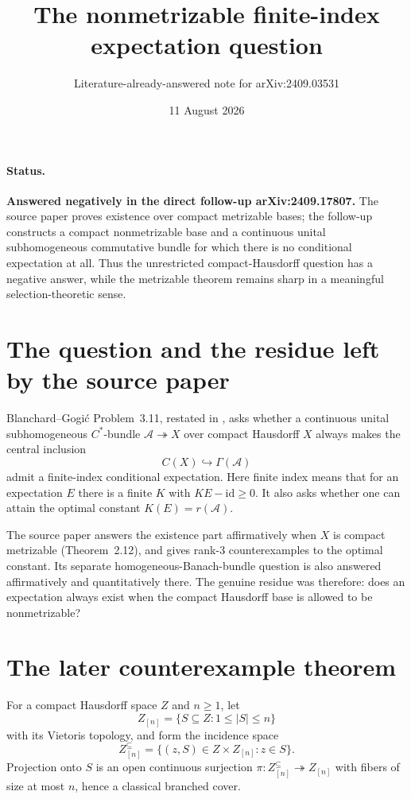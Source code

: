 \documentclass[11pt]{article}
\title{The nonmetrizable finite-index expectation question}
\author{Literature-already-answered note for arXiv:2409.03531}
\date{11 August 2026}
\newcommand{\A}{\mathcal A}
\begin{document}
\maketitle

\paragraph{Status.}
\textbf{Answered negatively in the direct follow-up arXiv:2409.17807.}
The source paper proves existence over compact metrizable bases; the follow-up
constructs a compact nonmetrizable base and a continuous unital
subhomogeneous commutative bundle for which there is no conditional
expectation at all.  Thus the unrestricted compact-Hausdorff question has a
negative answer, while the metrizable theorem remains sharp in a meaningful
selection-theoretic sense.

\section*{The question and the residue left by the source paper}
Blanchard--Gogi\'{c} Problem~3.11, restated in \cite{source}, asks whether a
continuous unital subhomogeneous $C^*$-bundle
\(
  \A\twoheadrightarrow X
\)
over compact Hausdorff $X$ always makes the central inclusion
\[
 C(X)\hookrightarrow \Gamma(\A)
\]
admit a finite-index conditional expectation.  Here finite index means that
for an expectation $E$ there is a finite $K$ with $K E-\mathrm{id}\ge0$.
It also asks whether one can attain the optimal constant $K(E)=r(\A)$.

The source paper answers the existence part affirmatively when $X$ is compact
metrizable (Theorem~2.12), and gives rank-$3$ counterexamples to the optimal
constant.  Its separate homogeneous-Banach-bundle question is also answered
affirmatively and quantitatively there.  The genuine residue was therefore:
does an expectation always exist when the compact Hausdorff base is allowed
to be nonmetrizable?

\section*{The later counterexample theorem}
For a compact Hausdorff space $Z$ and $n\ge1$, let
\[
 Z_{[n]}=\{S\subseteq Z:1\le |S|\le n\}
\]
with its Vietoris topology, and form the incidence space
\[
 Z^{\subseteq}_{[n]}
   =\{(z,S)\in Z\times Z_{[n]}:z\in S\}.
\]
Projection onto $S$ is an open continuous surjection
\(
 \pi:Z^{\subseteq}_{[n]}\twoheadrightarrow Z_{[n]}
\)
with fibers of size at most $n$, hence a classical branched cover.
\end{document}
